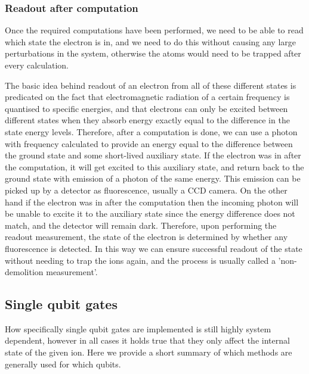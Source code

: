 \subsubsection{Readout after computation}
Once the required computations have been performed, we need to be able to read which state the electron is in, and we need to do this without causing any large perturbations in the system, otherwise the atoms would need to be trapped after every calculation. 

The basic idea behind readout of an electron from all of these different states is predicated on the fact that electromagnetic radiation of a certain frequency is quantised to specific energies, and that electrons can only be excited between different states when they absorb energy exactly equal to the difference in the state energy levels. Therefore, after a computation is done, we can use a photon with frequency calculated to provide an energy equal to the difference between the ground state \kz and some short-lived auxiliary state. If the electron was in \kz after the computation, it will get excited to this auxiliary state, and return back to the ground state with emission of a photon of the same energy. This emission can be picked up by a detector as fluorescence, usually a CCD camera. On the other hand if the electron was in \ko after the computation then the incoming photon will be unable to excite it to the auxiliary state since the energy difference does not match, and the detector will remain dark. Therefore, upon performing the readout measurement, the state of the electron is determined by whether any fluorescence is detected. In this way we can ensure successful readout of the state without needing to trap the ions again, and the process is usually called a 'non-demolition measurement'.


\subsection{Single qubit gates}
How specifically single qubit gates are implemented is still highly system dependent, however in all cases it holds true that they only affect the internal state of the given ion.
Here we provide a short summary of which methods are generally used for which qubits.

